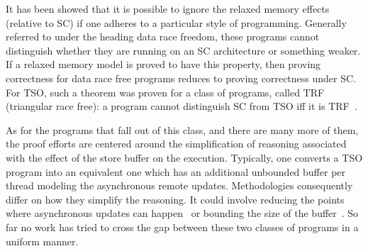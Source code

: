 \documentclass[preprint,9pt]{sigplanconf}
\begin{document}
It has been showed that it is possible to ignore the relaxed memory effects (relative to SC) if one adheres to a particular style of programming. 
Generally referred to under the heading data race freedom, these programs cannot distinguish whether they are running on an SC architecture or something weaker. 
If a relaxed memory model is proved to have this property, then proving correctness for data race free programs reduces to proving correctness under SC.
For TSO, such a theorem was proven for a class of programs, called TRF (triangular race free): a program cannot distinguish SC from TSO iff it is TRF~\cite{Owe2010}.

As for the programs that fall out of this class, and there are many more of them, the proof efforts are centered around the simplification of reasoning associated with the effect of the store buffer on the execution.
Typically, one converts a TSO program into an equivalent one which has an additional unbounded buffer per thread modeling the asynchronous remote updates. 
Methodologies consequently differ on how they simplify the reasoning. 
It could involve reducing the points where asynchronous updates can happen~\cite{AK20XX} or bounding the size of the buffer~\cite{BYZ20XX}.
So far no work has tried to cross the gap between these two classes of programs in a uniform manner.

\newcommand{\dontcare}{\ensuremath{\star}}
\newcommand{\genmemaccess}{\ensuremath{\mathsf{M}}}
\newcommand{\genmemaccesstso}{\ensuremath{\genmemaccess_{TSO}}}
\newcommand{\genread}{\ensuremath{\mathsf{R}}}
\newcommand{\aliwrite}{\ensuremath{\mathsf{W}}}
\newcommand{\aliwritex}[3]{\ensuremath{\aliwrite_{#1}(#2/#3)}}
\newcommand{\aliread}{\ensuremath{\mathsf{R}}}
\newcommand{\alireadx}[3]{\ensuremath{\aliread_{#1}(#2/#3)}}
\newcommand{\locwrite}{\ensuremath{\aliwrite^{\mathsf{l}}}}
\newcommand{\locwritex}[3]{\ensuremath{\locwrite_{#1}(#2/#3)}}
\newcommand{\remwrite}{\ensuremath{\aliwrite^{\mathsf{r}}}}
\newcommand{\remwritex}[3]{\ensuremath{\remwrite_{#1}(#2/#3)}}
\newcommand{\alibarrier}{\ensuremath{\mathsf{B}}}
\newcommand{\alibarrierx}[1]{\ensuremath{\alibarrier_{#1}}}
\newcommand{\alilock}{\ensuremath{\mathsf{L}}}
\newcommand{\alilockx}[1]{\ensuremath{\alilock_{#1}}}
\newcommand{\aliunlock}{\ensuremath{\mathsf{U}}}
\newcommand{\aliunlockx}[1]{\ensuremath{\aliunlock_{#1}}}
\end{document}
